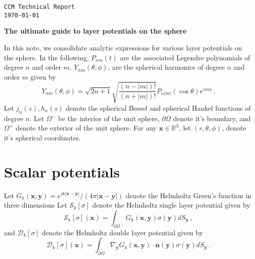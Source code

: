 \documentclass[11pt]{article}
\newcommand\bn{\boldsymbol n}
\newcommand\bx{\boldsymbol x}
\newcommand\by{\boldsymbol y}
\newcommand\cS{\mathcal{S}}
\newcommand\cD{\mathcal{D}}
\newcommand\bbR{\mathbb R}
\newcommand\pa{\partial}
\theoremstyle{definition}
\theoremstyle{remark}
\numberwithin{equation}{section}
\begin{document}



\begin{titlepage}

  \raggedleft
  {\texttt{CCM Technical Report\\
    \today}}
  
  \hrulefill

  \vspace{4\baselineskip}

  \raggedright
  {\LARGE \sffamily\bfseries The ultimate guide to layer potentials on the sphere}
  
  \vspace{\baselineskip}

  
  \vspace{3\baselineskip}
 \vspace{\baselineskip}
 
 \vspace{\baselineskip}
 
 
  
\end{titlepage}
\newpage
In this note, we consolidate analytic expressions for various layer potentials on the sphere. 
In the following, $P_{nm}(t)$ are the associated Legendre polynomials of degree $n$ and order $m$, $Y_{nm}(\theta,\phi)$, are the spherical harmonics of degree $n$ and order $m$ given by
\begin{equation}
Y_{nm}(\theta,\phi) = \sqrt{2n+1} \sqrt{\frac{(n-|m|)!}{(n+|m|)!}}  P_{n|m|}(\cos{\theta}) e^{im\phi} \, .
\end{equation}  
Let $j_{n}(z),h_{n}(z)$ denote the spherical Bessel and spherical Hankel functions of degree $n$. Let $\Omega^{-}$ be the interior of the unit sphere, $\pa \Omega$ denote it's boundary, and $\Omega^{+}$ denote the exterior of the unit sphere. For any $\bx \in \bbR^3$, let $(r,\theta,\phi)$, denote it's spherical coordinates.

\section*{Scalar potentials}
Let $G_{k}(\bx,\by) = e^{ik|\bx-\by|}/(4 \pi |\bx - \by|)$ denote the Helmholtz Green's function in three dimensions
Let $\cS_{k}[\sigma]$ denote the Helmholtz single layer potential given by
\begin{equation}
\cS_{k}[\sigma](\bx) = \int_{\pa \Omega} G_{k}(\bx,\by) \sigma(\by) dS_{\by} \, ,
\end{equation}
and $\cD_{k}[\sigma]$ denote the Helmholtz double layer potential given by
\begin{equation}
\cD_{k}[\sigma](\bx) = \int_{\pa \Omega} \nabla_{\by} G_{k}(\bx,\by)  \cdot \bn(\by) \sigma(\by) dS_{\by} \, .
\end{equation}
\end{document}
